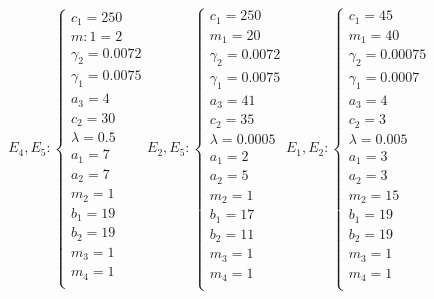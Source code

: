 \documentclass[12pt,a4paper]{article}
\numberwithin{theorem}{section}
\numberwithin{definition}{section}
\numberwithin{example}{section}
\begin{document}
\smallskip
\[E_4,E_5:\begin{cases}
	c_1=250\\
	m:1=2\\
	\gamma_2=0.0072\\
	\gamma_1=0.0075\\
	a_3=4\\
	c_2=30\\
	\lambda=0.5\\ %
	a_1=7\\
	a_2=7\\
	m_2=1\\
	b_1=19\\
	b_2=19\\
	m_3=1\\
	m_4=1\\
\end{cases}E_2,E_5:\begin{cases}
	c_1=250\\
	m_1=20\\
	\gamma_2=0.0072\\
	\gamma_1=0.0075\\
	a_3=41\\
	c_2=35\\
	\lambda=0.0005\\ %
	a_1=2\\
	a_2=5\\
	m_2=1\\
	b_1=17\\
	b_2=11\\
	m_3=1\\
	m_4=1\\
\end{cases}E_1,E_2:\begin{cases}
c_1=45\\
 m_1=40\\
 \gamma_2=0.00075\\
 \gamma_1=0.0007\\
 a_3=4\\
 c_2=3\\
 \lambda=0.005\\ %
 a_1=3\\
 a_2=3\\
 m_2=15\\
 b_1=19\\
 b_2=19\\
 m_3=1\\
 m_4=1\\
\end{cases}\]
\end{document}
